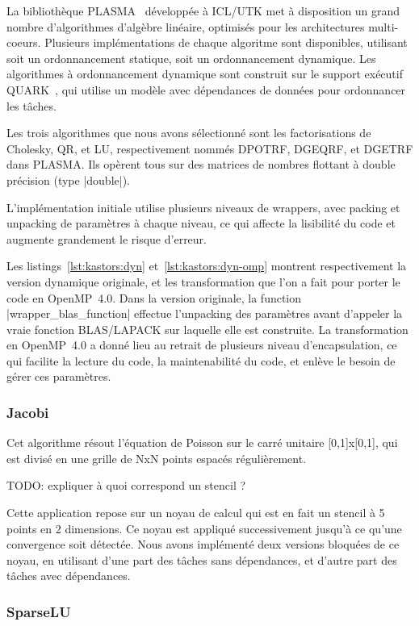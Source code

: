 La bibliothèque PLASMA~\cite{Kurzak2013} développée à ICL/UTK met à disposition un grand nombre d'algorithmes d'algèbre linéaire, optimisés pour les architectures multi-coeurs.
Plusieurs implémentations de chaque algoritme sont disponibles, utilisant soit un ordonnancement statique, soit un ordonnancement dynamique.
Les algorithmes à ordonnancement dynamique sont construit sur le support exécutif QUARK~\cite{YarKhan2011}, qui utilise un modèle avec dépendances de données pour ordonnancer les tâches.

Les trois algorithmes que nous avons sélectionné sont les factorisations de Cholesky, QR, et LU, respectivement nommés DPOTRF, DGEQRF, et DGETRF dans PLASMA.
Ils opèrent tous sur des matrices de nombres flottant à double précision (type |double|).

L'implémentation initiale utilise plusieurs niveaux de wrappers, avec packing et unpacking de paramètres à chaque niveau, ce qui affecte la lisibilité du code et augmente grandement le risque d'erreur.

Les listings~\ref{lst:kastors:dyn} et~\ref{lst:kastors:dyn-omp} montrent respectivement la version dynamique originale, et les transformation que l'on a fait pour porter le code en OpenMP~4.0.
Dans la version originale, la function |wrapper_blas_function| effectue l'unpacking des paramètres avant d'appeler la vraie fonction BLAS/LAPACK sur laquelle elle est construite.
La transformation en OpenMP~4.0 a donné lieu au retrait de plusieurs niveau d'encapsulation, ce qui facilite la lecture du code, la maintenabilité du code, et enlève le besoin de gérer ces paramètres.

\subsubsection{Jacobi}

Cet algorithme résout l'équation de Poisson sur le carré unitaire [0,1]x[0,1], qui est divisé en une grille de NxN points espacés régulièrement.

TODO: expliquer à quoi correspond un stencil ?

Cette application repose sur un noyau de calcul qui est en fait un stencil à 5 points en 2 dimensions.
Ce noyau est appliqué successivement jusqu'à ce qu'une convergence soit détectée.
Nous avons implémenté deux versions bloquées de ce noyau, en utilisant d'une part des tâches sans dépendances, et d'autre part des tâches avec dépendances.

\subsubsection{SparseLU}


